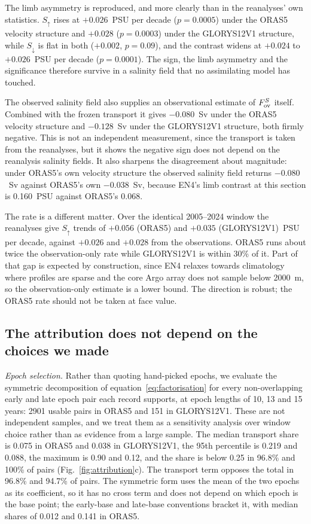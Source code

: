The limb asymmetry is reproduced, and more clearly than in the reanalyses'
own statistics. $S_{\uparrow}$ rises at $+0.026$~PSU per decade ($p=0.0005$)
under the ORAS5 velocity structure and $+0.028$ ($p=0.0003$) under the
GLORYS12V1 structure, while $S_{\downarrow}$ is flat in both ($+0.002$,
$p=0.09$), and the contrast widens at $+0.024$ to $+0.026$~PSU per decade
($p=0.0001$). The sign, the limb asymmetry and the significance therefore
survive in a salinity field that no assimilating model has touched.

The observed salinity field also supplies an observational estimate of $F_{\mathrm{ov}}^{S}$
itself. Combined with the frozen transport it gives $-0.080$~Sv under the ORAS5
velocity structure and $-0.128$~Sv under the GLORYS12V1 structure, both firmly
negative. This is not an independent measurement, since the transport is taken
from the reanalyses, but it shows the negative sign does not depend on the
reanalysis salinity fields. It also sharpens the disagreement about magnitude:
under ORAS5's own velocity structure the observed salinity field returns
$-0.080$~Sv against ORAS5's own $-0.038$~Sv, because EN4's limb contrast at this
section is 0.160~PSU against ORAS5's 0.068.

The rate is a different matter. Over the identical 2005--2024 window the
reanalyses give $S_{\uparrow}$ trends of $+0.056$ (ORAS5) and $+0.035$
(GLORYS12V1)~PSU per decade, against $+0.026$ and $+0.028$ from the
observations. ORAS5 runs about twice the observation-only rate while GLORYS12V1
is within 30\% of it. Part of that gap is expected by construction, since EN4
relaxes towards climatology where profiles are sparse and the core Argo array
does not sample below 2000~m, so the observation-only estimate is a lower bound.
The direction is robust; the ORAS5 rate should not be taken at face value.

\subsection*{The attribution does not depend on the choices we made}

\emph{Epoch selection.} Rather than quoting hand-picked epochs, we evaluate the
symmetric decomposition of equation~\eqref{eq:factorisation} for every
non-overlapping early and late epoch pair each record supports, at epoch lengths
of 10, 13 and 15 years: 2901 usable pairs in ORAS5 and 151 in GLORYS12V1. These
are not independent samples, and we treat them as a sensitivity analysis over
window choice rather than as evidence from a large sample. The median transport
share is 0.075 in ORAS5 and 0.038 in GLORYS12V1, the 95th percentile is 0.219
and 0.088, the maximum is 0.90 and 0.12, and the share is below 0.25 in 96.8\%
and 100\% of pairs (Fig.~\ref{fig:attribution}c). The transport term opposes the
total in 96.8\% and 94.7\% of pairs. The symmetric form uses the mean of the two
epochs as its coefficient, so it has no cross term and does not depend on which
epoch is the base point; the early-base and late-base conventions bracket it,
with median shares of 0.012 and 0.141 in ORAS5.

